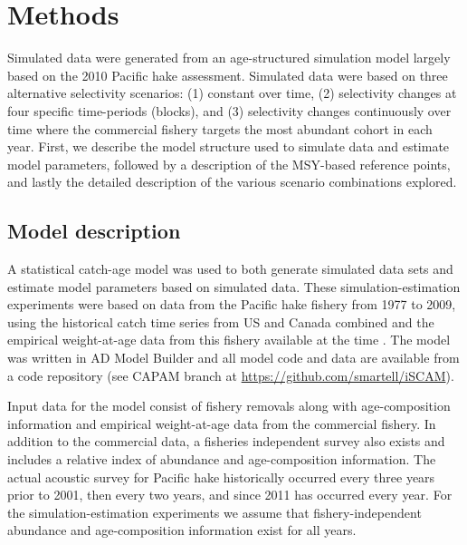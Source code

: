 \section*{Methods} %
\label{sec:methods}


Simulated data were generated from an age-structured simulation model largely based on the 2010 Pacific hake assessment.  Simulated data were based on three alternative selectivity scenarios: (1) constant over time, (2) selectivity changes at four specific time-periods (blocks), and (3) selectivity changes continuously over time where the commercial fishery targets the most abundant cohort in each year.  First, we describe the model structure used to simulate data and estimate model parameters, followed by a description of the MSY-based reference points, and lastly the detailed description of the various scenario combinations explored.

\subsection*{Model description} %
\label{sub:model_description}

A statistical catch-age model was used to both generate simulated data sets and estimate model parameters based on simulated data. These simulation-estimation experiments were based on data from the Pacific hake fishery from 1977 to 2009, using the historical catch time series from US and Canada combined and the empirical weight-at-age data from this fishery available at the time \citep{Martell2009}.  The model was written in AD Model Builder \citep{fournier2011ad} and all model code and data are available from a code repository (see CAPAM branch at \url{https://github.com/smartell/iSCAM}).

Input data for the model consist of fishery removals along with age-composition information and empirical weight-at-age data from the commercial fishery.  In addition to the commercial data, a fisheries independent survey also exists and includes a relative index of abundance and age-composition information.  The actual acoustic survey for Pacific hake historically occurred every three years prior to 2001, then every two years, and since 2011 has occurred every year. For the simulation-estimation experiments we assume that fishery-independent abundance and age-composition information exist for all years.

